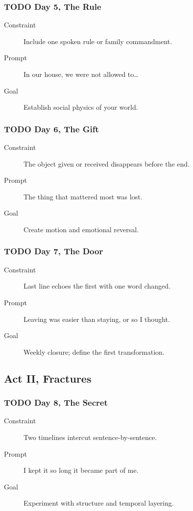 \documentclass[11pt]{article}
\begin{document}
\subsubsection*{{\bfseries\sffamily TODO} Day 5, The Rule}
\label{sec:org2c2a801}
\begin{description}
\item[{Constraint}] Include one spoken rule or family commandment.
\item[{Prompt}] In our house, we were not allowed to…
\item[{Goal}] Establish social physics of your world.
\end{description}
\subsubsection*{{\bfseries\sffamily TODO} Day 6, The Gift}
\label{sec:org4b232bc}
\begin{description}
\item[{Constraint}] The object given or received disappears before the end.
\item[{Prompt}] The thing that mattered most was lost.
\item[{Goal}] Create motion and emotional reversal.
\end{description}
\subsubsection*{{\bfseries\sffamily TODO} Day 7, The Door}
\label{sec:org1e1a039}
\begin{description}
\item[{Constraint}] Last line echoes the first with one word changed.
\item[{Prompt}] Leaving was easier than staying, or so I thought.
\item[{Goal}] Weekly closure; define the first transformation.
\end{description}
\subsection*{Act II, Fractures}
\label{sec:orgafc3054}
\subsubsection*{{\bfseries\sffamily TODO} Day 8, The Secret}
\label{sec:org30773c4}
\begin{description}
\item[{Constraint}] Two timelines intercut sentence-by-sentence.
\item[{Prompt}] I kept it so long it became part of me.
\item[{Goal}] Experiment with structure and temporal layering.
\end{description}
\end{document}
